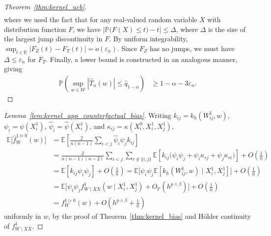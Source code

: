 \documentclass[11pt,lof]{puthesis}
\renewcommand{\P}{\ensuremath{\mathbb{P}}}
\newcommand{\R}{\ensuremath{\mathbb{R}}}
\newcommand{\E}{\ensuremath{\mathbb{E}}}
\newcommand{\cW}{\ensuremath{\mathcal{W}}}
\theoremstyle{break}
\theoremstyle{proof}
\newtheorem{proof}{Proof}
\begin{document}
\begin{proof}[Theorem~\ref{thm:kernel_ucb}]
\begin{align*}
  \end{align*}
  where we used the fact that for any
  real-valued random variable $X$ with distribution function $F$,
  we have
  $\big|\P\big(F(X) \leq t\big) - t\big| \leq \Delta$,
  where $\Delta$ is the size of the
  largest jump discontinuity in $F$.
  By uniform integrability,
  $\sup_{t \in \R} \big| F_Z(t) - F_T(t) \big| = o(\varepsilon_n)$.
  Since $F_Z$ has no jumps,
  we must have $\Delta \leq \varepsilon_n$ for $F_T$.
  Finally, a lower bound is constructed in an analogous manner,
  giving
  \begin{align*}
    \P\left(
      \sup_{w \in \cW}
      \left| \hat T_n(w) \right|
      \leq
      \hat q_{1-\alpha}
    \right)
    &\geq
    1 - \alpha - 3\varepsilon_n.
  \end{align*}
\end{proof}

\begin{proof}[Lemma~\ref{lem:kernel_app_counterfactual_bias}]

  Writing
  $k_{i j} = k_h(W_{i j}^1, w)$,
  $\psi_i = \psi(X_i^1)$,
  $\hat\psi_i = \hat\psi(X_i^1)$,
  and $\kappa_{i j} = \kappa(X_i^0, X_i^1, X_j^1)$,
  \begin{align*}
    \E\big[\hat f_W^{1 \triangleright 0}(w)\big]
    &=
    \E\left[
      \frac{2}{n(n-1)}
      \sum_{i<j}
      \hat \psi_i
      \hat \psi_j
      k_{i j}
    \right] \\
    &=
    \frac{2}{n(n-1)(n-2)}
    \sum_{i < j}
    \sum_{r \notin \{i,j\}}
    \E\left[
      k_{i j}
      \Big(
        \psi_i
        \psi_j
        +\psi_i
        \kappa_{r j}
        +\psi_j
        \kappa_{r i}
      \Big)
    \right]
    + O\left(\frac{1}{n}\right) \\
    &=
    \E\left[
      k_{i j}
      \psi_i
      \psi_j
    \right]
    + O\left(\frac{1}{n}\right)
    =
    \E\big[
      \psi_i
      \psi_j
      \E\left[
        k_h(W_{i j}^1, w)
        \mid X_i^1, X_j^1
      \right]
    \big]
    + O\left(\frac{1}{n}\right) \\
    &=
    \E\big[
      \psi_i
      \psi_j
      f_{W \mid XX}^1(w \mid X_i^1, X_j^1)
      + O_\P\left( h^{p \wedge \beta} \right)
    \big]
    + O\left(\frac{1}{n}\right) \\
    &=
    f_W^{1 \triangleright 0}(w)
    + O\left( h^{p \wedge \beta} + \frac{1}{n}\right)
  \end{align*}
  uniformly in $w$, by the proof of
  Theorem~\ref{thm:kernel_bias} and H{\"o}lder continuity
  of $f_{W \mid XX}^1$.
\end{proof}
\end{document}

